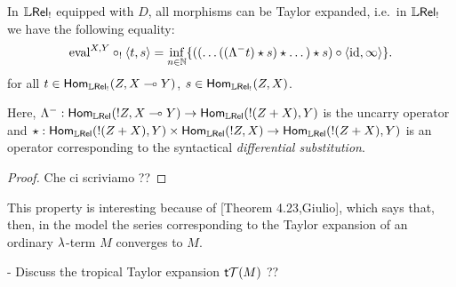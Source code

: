 \begin{theorem}\label{thm:modelsTaylor}
 In $\mathbb{L} \mathsf{Rel}_!$ equipped with $D$, all morphisms can be Taylor expanded, i.e.\ in $\mathbb{L} \mathsf{Rel}_!$ we have the following equality:
 \[
  \mathrm{eval}^{X,Y}\circ_!\langle t,s\rangle =
  \inf\limits_{n\in\mathbb{N}}
  \{((\dots((\Lambda^- t)\star s)\star \dots)\star s)\circ \langle \mathrm{id},\infty \rangle\}.
 \]
 for all $t\in\mathsf{Hom}_{\mathbb{L} \mathsf{Rel}_!}(Z,X\multimap Y)$, $s\in\mathsf{Hom}_{\mathbb{L} \mathsf{Rel}_!}(Z,X)$.
\end{theorem}
Here, $\Lambda^-:\mathsf{Hom}_{\mathbb{L} \mathsf{Rel}}(!Z,X\multimap Y)\to \mathsf{Hom}_{\mathbb{L} \mathsf{Rel}}(!(Z+X),Y)$ is the uncarry operator and $\star:\mathsf{Hom}_{\mathbb{L} \mathsf{Rel}}(!(Z+X),Y)\times\mathsf{Hom}_{\mathbb{L} \mathsf{Rel}}(!Z,X)\to \mathsf{Hom}_{\mathbb{L} \mathsf{Rel}}(!(Z+X),Y)$ is an operator corresponding to the syntactical \emph{differential substitution}.
\begin{proof}
 Che ci scriviamo ??
\end{proof}

This property is interesting because of [Theorem 4.23,Giulio], which says that, then, in the model the series corresponding to the Taylor expansion of an ordinary $\lambda$-term $M$ converges to $M$.

- Discuss the tropical Taylor expansion $\mathsf{t} \mathcal{T}(M)$ ?? 

